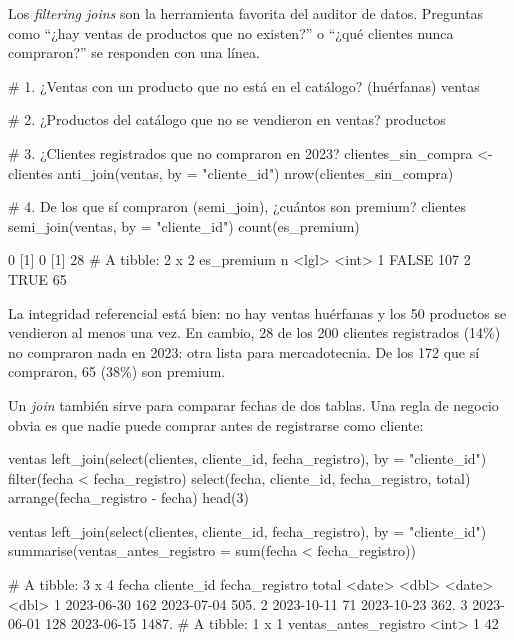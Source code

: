 Los \emph{filtering joins} son la herramienta favorita del auditor de datos.
Preguntas como ``¿hay ventas de productos que no existen?'' o ``¿qué
clientes nunca compraron?'' se responden con una línea.

\begin{rcode}
# 1. ¿Ventas con un producto que no está en el catálogo? (huérfanas)
ventas %

# 2. ¿Productos del catálogo que no se vendieron en ventas?
productos %

# 3. ¿Clientes registrados que no compraron en 2023?
clientes_sin_compra <- clientes %
  anti_join(ventas, by = "cliente_id")
nrow(clientes_sin_compra)

# 4. De los que sí compraron (semi_join), ¿cuántos son premium?
clientes %
  semi_join(ventas, by = "cliente_id") %
  count(es_premium)
\end{rcode}
\begin{rsalida}
[1] 0
[1] 0
[1] 28
# A tibble: 2 x 2
  es_premium     n
  <lgl>      <int>
1 FALSE        107
2 TRUE          65
\end{rsalida}

La integridad referencial está bien: no hay ventas huérfanas y los 50
productos se vendieron al menos una vez. En cambio, 28 de los 200 clientes
registrados (14\%) no compraron nada en 2023: otra lista para
mercadotecnia. De los 172 que sí compraron, 65 (38\%) son premium.

Un \emph{join} también sirve para comparar fechas de dos tablas. Una regla
de negocio obvia es que nadie puede comprar antes de registrarse como
cliente:

\begin{rcode}
ventas %
  left_join(select(clientes, cliente_id, fecha_registro),
            by = "cliente_id") %
  filter(fecha < fecha_registro) %
  select(fecha, cliente_id, fecha_registro, total) %
  arrange(fecha_registro - fecha) %
  head(3)

ventas %
  left_join(select(clientes, cliente_id, fecha_registro),
            by = "cliente_id") %
  summarise(ventas_antes_registro = sum(fecha < fecha_registro))
\end{rcode}
\begin{rsalida}
# A tibble: 3 x 4
  fecha      cliente_id fecha_registro total
  <date>          <dbl> <date>         <dbl>
1 2023-06-30        162 2023-07-04      505.
2 2023-10-11         71 2023-10-23      362.
3 2023-06-01        128 2023-06-15     1487.
# A tibble: 1 x 1
  ventas_antes_registro
                  <int>
1                    42
\end{rsalida}

